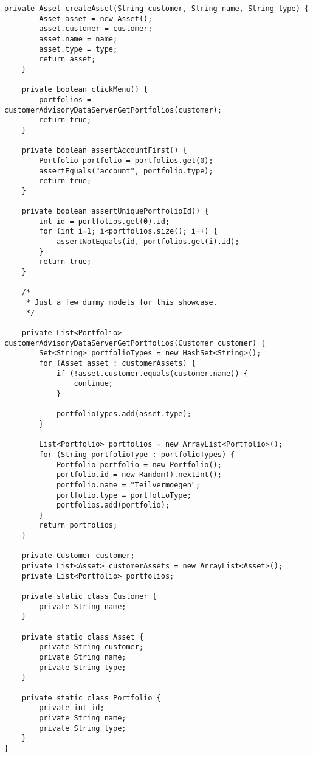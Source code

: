 \begin{lstlisting}[caption=Demand111958.java, label=code:fluent_demand]
	private Asset createAsset(String customer, String name, String type) {
		Asset asset = new Asset();
		asset.customer = customer;
		asset.name = name;
		asset.type = type;
		return asset;
	}

	private boolean clickMenu() {
		portfolios = customerAdvisoryDataServerGetPortfolios(customer);
		return true;
	}

	private boolean assertAccountFirst() {
		Portfolio portfolio = portfolios.get(0);
		assertEquals("account", portfolio.type);
		return true;
	}

	private boolean assertUniquePortfolioId() {
		int id = portfolios.get(0).id;
		for (int i=1; i<portfolios.size(); i++) {
			assertNotEquals(id, portfolios.get(i).id);
		}
		return true;
	}
	
	/*
	 * Just a few dummy models for this showcase.
	 */
	
	private List<Portfolio> customerAdvisoryDataServerGetPortfolios(Customer customer) {
		Set<String> portfolioTypes = new HashSet<String>();
		for (Asset asset : customerAssets) {
			if (!asset.customer.equals(customer.name)) {
				continue;
			}
			
			portfolioTypes.add(asset.type);
		}
		
		List<Portfolio> portfolios = new ArrayList<Portfolio>();
		for (String portfolioType : portfolioTypes) {
			Portfolio portfolio = new Portfolio();
			portfolio.id = new Random().nextInt();
			portfolio.name = "Teilvermoegen";
			portfolio.type = portfolioType;
			portfolios.add(portfolio);
		}
		return portfolios;
	}
	
	private Customer customer;
	private List<Asset> customerAssets = new ArrayList<Asset>();
	private List<Portfolio> portfolios;
	
	private static class Customer {
		private String name;
	}
	
	private static class Asset {
		private String customer;
		private String name;
		private String type;
	}
	
	private static class Portfolio {
		private int id;
		private String name;
		private String type;
	}
}
\end{lstlisting}















